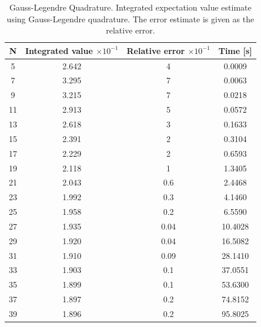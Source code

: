 \documentclass[%
reprint,nofootinbib,
amsmath,amssymb,
aps,
]{revtex4-1}
\begin{document}
\begin{table}[!h]
	\caption {Gauss-Legendre Quadrature. \label{legendre_values} \centering  Integrated expectation value estimate using Gauss-Legendre quadrature. The error estimate is given as the relative error.} 
	\begin{tabular}{|c|c|c|c|}
		\hline 
		\hspace{5mm} \textbf{N} \hspace{5mm} & \textbf{Integrated value $\times 10^{-1}$} & \hspace{3mm}\textbf{Relative error $\times 10^{-1}$} & \hspace{3mm}\textbf{Time  [s]} \hspace{5mm}\\
		\hline 
			5 & 2.642  & 4  & 0.0009 \\
			7 & 3.295  & 7  & 0.0063 \\
			9 & 3.215  & 7  & 0.0218 \\
			11 & 2.913  & 5  & 0.0572 \\
			13 & 2.618  & 3  & 0.1633 \\
			15 & 2.391  & 2  & 0.3104 \\
			17 & 2.229  & 2  & 0.6593 \\
			19 & 2.118  & 1  & 1.3405 \\
			21 & 2.043  & 0.6  & 2.4468 \\
			23 & 1.992  & 0.3  & 4.1460 \\
			25 & 1.958  & 0.2  & 6.5590 \\
			27 & 1.935  & 0.04  & 10.4028 \\
			29 & 1.920  & 0.04  & 16.5082 \\
			31 & 1.910  & 0.09  & 28.1410 \\
			33 & 1.903  & 0.1  & 37.0551 \\
			35 & 1.899  & 0.1  & 53.6300 \\
			37 & 1.897  & 0.2  & 74.8152 \\
			39 & 1.896  & 0.2  & 95.8025 \\

		\hline 
	\end{tabular} 
\end{table}
\end{document}
